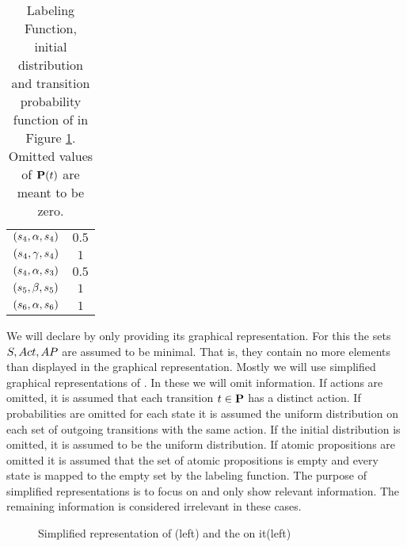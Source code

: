 \documentclass[preview]{standalone}
\begin{document}
\begin{exmp}
\begin{table}[h!]
{\begin{center}
\begin{tabular}{c|c}
				$({s}_4,{\alpha}, {s}_4)$ & $0.5$\\
				$({s}_4,{\gamma}, {s}_4)$ & $1$\\
				$({s}_4,{\alpha}, {s}_3)$ & $0.5$\\
				$({s}_5,{\beta}, {s}_5)$ & $1$\\
				$({s}_6,{\alpha}, {s}_6)$ & $1$\\				
			\end{tabular}
		\end{center}
	}
	\caption{Labeling Function, initial distribution and transition probability function of \mdpN in Figure \ref{fig:exampleMdp}. Omitted values of ${{\textbf{P}}}(t)$ are meant to be zero.}
	\label{tab:atomicpropsandlabelingfunction}
\end{table}

We will declare \mdpsN by only providing its graphical representation. For this the sets ${S}, {Act}, {AP}$ are assumed to be minimal. That is, they contain no more elements than displayed in the graphical representation. Mostly we will use simplified graphical representations of \mdpsN. In these we will omit information. If actions are omitted, it is assumed that each transition $t \in {\ensuremath{{\textbf{P}}}}$ has a distinct action. If probabilities are omitted for each state it is assumed the uniform distribution on each set of outgoing transitions with the same action. If the initial distribution is omitted, it is assumed to be the uniform distribution. If atomic propositions are omitted it is assumed that the set of atomic propositions is empty and every state is mapped to the empty set by the labeling function. The purpose of simplified representations is to focus on and only show relevant information. The remaining information is considered irrelevant in these cases.

\begin{figure}[!htb]
	\centering 
	\caption{Simplified representation of \mdp (left) and the \viewN \viewinitstates on it(left)}
	\label{fig:exampleMdp}  
\end{figure}
\end{exmp}
\end{document}
